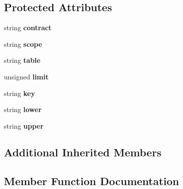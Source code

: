 \subsection*{Protected Attributes}
\begin{DoxyCompactItemize}
\item 
\mbox{\label{classteos_1_1command_1_1_get_table_options_a70e8e164df0b518f1147da98680e33b8}} 
string {\bfseries contract}
\item 
\mbox{\label{classteos_1_1command_1_1_get_table_options_a5895ffd2367c60345c0ea9b18c1f97f1}} 
string {\bfseries scope}
\item 
\mbox{\label{classteos_1_1command_1_1_get_table_options_a1ffe2c0a4aa1ef8e550616f36ebd14e2}} 
string {\bfseries table}
\item 
\mbox{\label{classteos_1_1command_1_1_get_table_options_af8450a13304574151c9cb8787a174614}} 
unsigned {\bfseries limit}
\item 
\mbox{\label{classteos_1_1command_1_1_get_table_options_a3070c3e6665a0ec03e637f315e9d17b0}} 
string {\bfseries key}
\item 
\mbox{\label{classteos_1_1command_1_1_get_table_options_a3b19da7686f7c93abbba4dd0b0690f17}} 
string {\bfseries lower}
\item 
\mbox{\label{classteos_1_1command_1_1_get_table_options_a98f3e59e470bd182e9c1036eea94fd79}} 
string {\bfseries upper}
\end{DoxyCompactItemize}
\subsection*{Additional Inherited Members}


\subsection{Member Function Documentation}
\mbox{\label{classteos_1_1command_1_1_get_table_options_a764b61a7d83e508673b73100c45c3d13}} 
